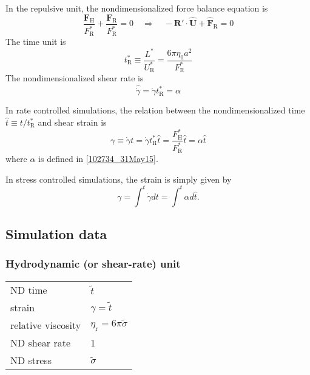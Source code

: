 \documentclass[fontsize=11pt]{scrartcl}
\begin{document}
In the repulsive unit,
the nondimensionalized
force balance equation is
\begin{equation}
 \frac{\bm{F}_{\mathrm{H}}}{F^{\ast}_{\mathrm{R}}}
  +
  \frac{\bm{F}_{\mathrm{R}}}{F^{\ast}_{\mathrm{R}}}  = 0
      \quad
  \Longrightarrow
    \quad
    - \bm{R}' \cdot \hat{\bm{U}} +
    \hat{\bm{F}}_{\mathrm{R}} = 0
\end{equation}
The time unit is
\begin{equation}
 t_{\mathrm{R}}^{\ast}
  \equiv \frac{L^{\ast}}{U_{\mathrm{R}}^{\ast}}
  = \frac{6 \pi \eta_0 a^2}{F_{\mathrm{R}}^{\ast}}
\end{equation}
%
The nondimensionalized shear rate is
\begin{equation}
 \hat{\dot{\gamma}} =
  \dot{\gamma} t_{\mathrm{R}}^{\ast}
  = \alpha 
\end{equation}



In rate controlled simulations,
the relation between
the nondimensionalized time
$\hat{t} \equiv t /t_{\mathrm{R}}^{\ast}$
and shear strain is
\begin{equation}
 \gamma
  \equiv \dot{\gamma} t 
  = \dot{\gamma} t_{\mathrm{R}}^{\ast} \hat{t} 
   = 
\frac{F_{\mathrm{H}}^{\ast}}{F_{\mathrm{R}}^{\ast}}
\hat{t} = \alpha \hat{t}
\end{equation}
where $\alpha$ is defined in \eqref{102734_31May15}.

In stress controlled simulations,
the strain is simply given by
\begin{equation}
 \gamma
 = \int^{t} \dot{\gamma} dt
 = \int^{t} \alpha d\hat{t}.
\end{equation}



\subsection*{Simulation data}


\subsubsection*{Hydrodynamic (or shear-rate) unit}
\begin{center}
\begin{tabular}{ll}
  ND time & $\tilde{t}$  \\
  strain & $\gamma = \tilde{t}$ \\
  relative viscosity &
  $ \eta_{\mathrm{r}}
     = 6 \pi \tilde{\sigma}$ \\
 ND shear rate & 1 \\
ND stress & $\tilde{\sigma} $
\end{tabular} 
\end{center}
\end{document}
